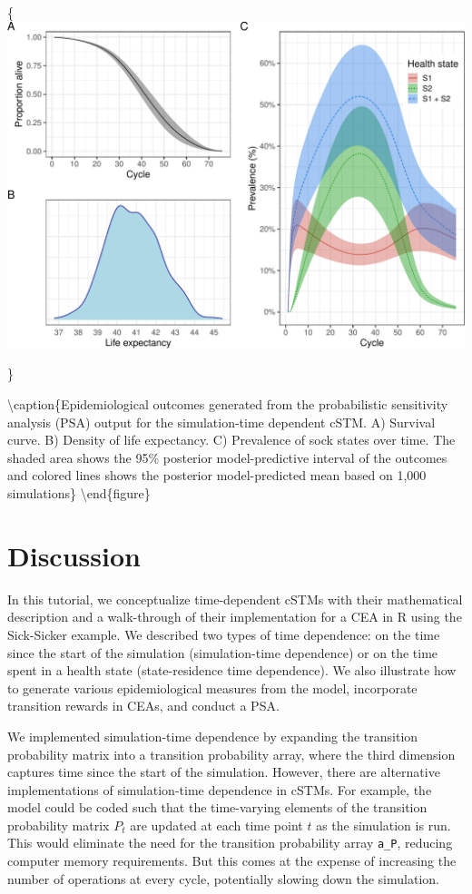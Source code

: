 \documentclass[
]{article}
\begin{document}
\{\centering \includegraphics{figs/PSA-EPI-figures-1}

\}

\textbackslash caption\{Epidemiological outcomes generated from the probabilistic sensitivity analysis (PSA) output for the simulation-time dependent cSTM. A) Survival curve. B) Density of life expectancy. C) Prevalence of sock states over time. The shaded area shows the 95\% posterior model-predictive interval of the outcomes and colored lines shows the posterior model-predicted mean based on 1,000 simulations\}\label{fig:PSA-EPI-figures}
\textbackslash end\{figure\}

\hypertarget{discussion}{%
\section{Discussion}\label{discussion}}

In this tutorial, we conceptualize time-dependent cSTMs with their mathematical description and a walk-through of their implementation for a CEA in R using the Sick-Sicker example. We described two types of time dependence: on the time since the start of the simulation (simulation-time dependence) or on the time spent in a health state (state-residence time dependence). We also illustrate how to generate various epidemiological measures from the model, incorporate transition rewards in CEAs, and conduct a PSA.

We implemented simulation-time dependence by expanding the transition probability matrix into a transition probability array, where the third dimension captures time since the start of the simulation. However, there are alternative implementations of simulation-time dependence in cSTMs. For example, the model could be coded such that the time-varying elements of the transition probability matrix \(P_t\) are updated at each time point \(t\) as the simulation is run. This would eliminate the need for the transition probability array \texttt{a\_P}, reducing computer memory requirements. But this comes at the expense of increasing the number of operations at every cycle, potentially slowing down the simulation.
\end{document}
